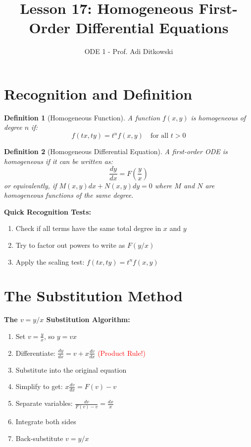 \documentclass[12pt]{article}
\title{Lesson 17: Homogeneous First-Order Differential Equations}
\author{ODE 1 - Prof. Adi Ditkowski}
\date{}
\newtheorem{definition}{Definition}
\begin{document}
\maketitle

\section{Recognition and Definition}

\begin{definition}[Homogeneous Function]
A function $f(x,y)$ is homogeneous of degree $n$ if:
$$f(tx, ty) = t^n f(x,y) \quad \text{for all } t > 0$$
\end{definition}

\begin{definition}[Homogeneous Differential Equation]
A first-order ODE is homogeneous if it can be written as:
$$\frac{dy}{dx} = F\left(\frac{y}{x}\right)$$
or equivalently, if $M(x,y)dx + N(x,y)dy = 0$ where $M$ and $N$ are homogeneous functions of the same degree.
\end{definition}

\begin{keypoint}
\textbf{Quick Recognition Tests:}
\begin{enumerate}
    \item Check if all terms have the same total degree in $x$ and $y$
    \item Try to factor out powers to write as $F(y/x)$
    \item Apply the scaling test: $f(tx, ty) = t^n f(x,y)$
\end{enumerate}
\end{keypoint}

\section{The Substitution Method}

\begin{transformation}
\textbf{The $v = y/x$ Substitution Algorithm:}
\begin{enumerate}
    \item Set $v = \frac{y}{x}$, so $y = vx$
    \item Differentiate: $\frac{dy}{dx} = v + x\frac{dv}{dx}$ \textcolor{red}{(Product Rule!)}
    \item Substitute into the original equation
    \item Simplify to get: $x\frac{dv}{dx} = F(v) - v$
    \item Separate variables: $\frac{dv}{F(v) - v} = \frac{dx}{x}$
    \item Integrate both sides
    \item Back-substitute $v = y/x$
\end{enumerate}
\end{transformation}
\end{document}
